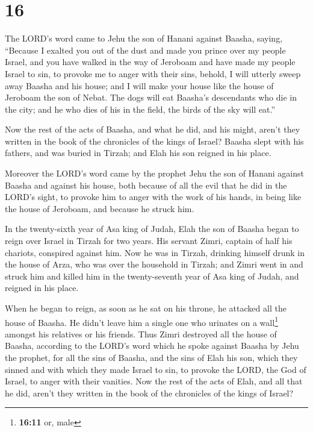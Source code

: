 \hypertarget{section-15}{%
\section{16}\label{section-15}}

 The LORD's word came to Jehu the son of Hanani against
Baasha, saying,  ``Because I exalted you out of the dust
and made you prince over my people Israel, and you have walked in the
way of Jeroboam and have made my people Israel to sin, to provoke me to
anger with their sins,  behold, I will utterly sweep away
Baasha and his house; and I will make your house like the house of
Jeroboam the son of Nebat.  The dogs will eat Baasha's
descendants who die in the city; and he who dies of his in the field,
the birds of the sky will eat.''

 Now the rest of the acts of Baasha, and what he did, and
his might, aren't they written in the book of the chronicles of the
kings of Israel?  Baasha slept with his fathers, and was
buried in Tirzah; and Elah his son reigned in his place.

 Moreover the LORD's word came by the prophet Jehu the son
of Hanani against Baasha and against his house, both because of all the
evil that he did in the LORD's sight, to provoke him to anger with the
work of his hands, in being like the house of Jeroboam, and because he
struck him.

 In the twenty-sixth year of Asa king of Judah, Elah the
son of Baasha began to reign over Israel in Tirzah for two years.
 His servant Zimri, captain of half his chariots,
conspired against him. Now he was in Tirzah, drinking himself drunk in
the house of Arza, who was over the household in Tirzah; 
and Zimri went in and struck him and killed him in the twenty-seventh
year of Asa king of Judah, and reigned in his place.

 When he began to reign, as soon as he sat on his throne,
he attacked all the house of Baasha. He didn't leave him a single one
who urinates on a wall\footnote{\textbf{16:11} or, male} amongst his
relatives or his friends.  Thus Zimri destroyed all the
house of Baasha, according to the LORD's word which he spoke against
Baasha by Jehu the prophet,  for all the sins of Baasha,
and the sins of Elah his son, which they sinned and with which they made
Israel to sin, to provoke the LORD, the God of Israel, to anger with
their vanities.  Now the rest of the acts of Elah, and
all that he did, aren't they written in the book of the chronicles of
the kings of Israel?

